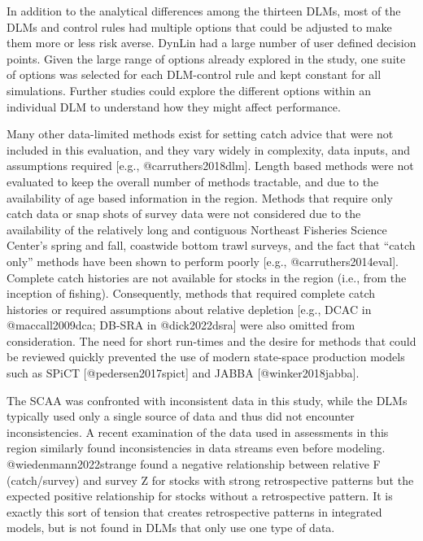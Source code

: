 \documentclass[
]{article}
\begin{document}
In addition to the analytical differences among the thirteen DLMs, most of the DLMs and control rules had multiple options that could be adjusted to make them more or less risk averse. DynLin had a large number of user defined decision points. Given the large range of options already explored in the study, one suite of options was selected for each DLM-control rule and kept constant for all simulations. Further studies could explore the different options within an individual DLM to understand how they might affect performance.

Many other data-limited methods exist for setting catch advice that were not included in this evaluation, and they vary widely in complexity, data inputs, and assumptions required {[}e.g., @carruthers2018dlm{]}. Length based methods were not evaluated to keep the overall number of methods tractable, and due to the availability of age based information in the region. Methods that require only catch data or snap shots of survey data were not considered due to the availability of the relatively long and contiguous Northeast Fisheries Science Center's spring and fall, coastwide bottom trawl surveys, and the fact that ``catch only'' methods have been shown to perform poorly {[}e.g., @carruthers2014eval{]}. Complete catch histories are not available for stocks in the region (i.e., from the inception of fishing). Consequently, methods that required complete catch histories or required assumptions about relative depletion {[}e.g., DCAC in @maccall2009dca; DB-SRA in @dick2022dsra{]} were also omitted from consideration. The need for short run-times and the desire for methods that could be reviewed quickly prevented the use of modern state-space production models such as SPiCT {[}@pedersen2017spict{]} and JABBA {[}@winker2018jabba{]}.

The SCAA was confronted with inconsistent data in this study, while the DLMs typically used only a single source of data and thus did not encounter inconsistencies. A recent examination of the data used in assessments in this region similarly found inconsistencies in data streams even before modeling. @wiedenmann2022strange found a negative relationship between relative F (catch/survey) and survey Z for stocks with strong retrospective patterns but the expected positive relationship for stocks without a retrospective pattern. It is exactly this sort of tension that creates retrospective patterns in integrated models, but is not found in DLMs that only use one type of data.
\end{document}
